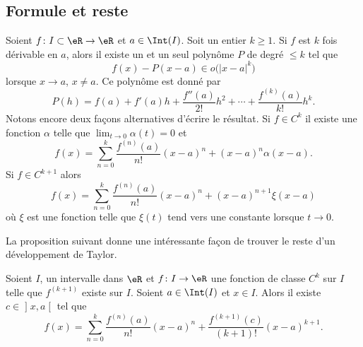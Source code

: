 \subsection{Formule et reste}

\begin{proposition}     \label{PropDevTaylorPol}
    Soient $f\colon I\subset\eR\to \eR$ et $a\in\Int(I)$. Soit un entier $k\geq 1$. Si $f$ est $k$ fois dérivable en $a$, alors il existe un et un seul polynôme $P$ de degré $\leq k$ tel que
    \begin{equation}
        f(x)-P(x-a)\in o\big( | x-a |^k \big)
    \end{equation}
    lorsque $x\to a$, $x\neq a$. Ce polynôme  est donné par
    \begin{equation}
        P(h)=f(a)+f'(a)h+\frac{ f''(a) }{ 2! }h^2+\cdots+\frac{ f^{(k)}(a) }{ k! }h^k.
    \end{equation}
    Notons encore deux façons alternatives d'écrire le résultat. Si \( f\in C^k\) il existe une fonction \( \alpha\) telle que \( \lim_{t\to 0} \alpha(t)=0\) et
    \begin{equation}
        f(x)=\sum_{n=0}^k\frac{ f^{(n)}(a) }{ n! }(x-a)^n+(x-a)^n\alpha(x-a).
    \end{equation}
    Si \( f\in C^{k+1}\) alors
    \begin{equation}        \label{EquQtpoN}
        f(x)=\sum_{n=0}^k\frac{ f^{(n)}(a) }{ n! }(x-a)^n+(x-a)^{n+1}\xi(x-a)
    \end{equation}
    où \( \xi\) est une fonction telle que \( \xi(t)\) tend vers une constante lorsque \( t\to 0\).
\end{proposition}

La proposition suivant donne une intéressante façon de trouver le reste d'un développement de Taylor.
\begin{proposition}     \label{PropResteTaylorc}
Soient $I$, un intervalle dans $\eR$ et $f\colon I\to \eR$ une fonction de classe $C^k$ sur $I$ telle que $f^{(k+1)}$ existe sur $I$. Soient $a\in\Int(I)$ et $x\in I$. Alors il existe $c\in\mathopen] x , a \mathclose[$ tel que
\begin{equation}
    f(x)=\sum_{n=0}^k\frac{ f^{(n)}(a) }{ n! }(x-a)^n+\frac{ f^{(k+1)}(c) }{ (k+1)! }(x-a)^{k+1}.
\end{equation}
\end{proposition}

